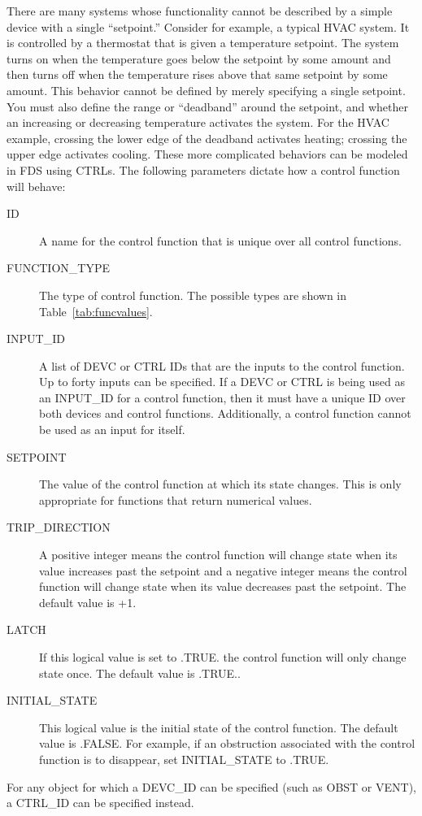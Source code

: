 \documentclass[11pt]{book}
\begin{document}
There are many systems whose functionality cannot be described by a simple device with a single ``setpoint.'' Consider for example, a typical HVAC system.  It is controlled by a thermostat that is given a temperature setpoint. The system turns on when the temperature goes below the setpoint by some amount and then turns off when the temperature rises above that same setpoint by some amount. This behavior cannot be defined by merely specifying a single setpoint. You must also define the range or ``deadband'' around the setpoint, and whether an increasing or decreasing temperature activates the system.  For the HVAC example, crossing the lower edge of the deadband activates heating; crossing the upper edge activates cooling.  These more complicated behaviors can be modeled in FDS using {\ct CTRL}s.  The following parameters dictate how a control function will behave:
\begin{description}
\item[{\ct ID}] A name for the control function that is unique over all control functions.
\item[{\ct FUNCTION\_TYPE}] The type of control function.  The possible types are shown in Table~\ref{tab:funcvalues}.
\item[{\ct INPUT\_ID}] A list of {\ct DEVC} or {\ct CTRL} {\ct ID}s that are the inputs to the control function.  Up to forty inputs can be specified.  If a {\ct DEVC} or {\ct CTRL} is being used as an {\ct INPUT\_ID} for a control function, then it must have a unique {\ct ID} over both devices and control functions.  Additionally, a control function cannot be used as an input for itself.
\item[{\ct SETPOINT}] The value of the control function at which its state changes. This is only appropriate for functions that return numerical values.
\item[{\ct TRIP\_DIRECTION}] A positive integer means the control function will change state when its value increases
past the setpoint and a negative integer means the control function will change state
when its value decreases past the setpoint.  The default value is +1.
\item[{\ct LATCH}] If this logical value is set to {\ct .TRUE.} the control function will only change state once.
The default value is {\ct .TRUE.}.
\item[{\ct INITIAL\_STATE}] This logical value is the initial state of the control function. The default value
is {\ct .FALSE.} For example, if an obstruction associated with the control function is to disappear, set {\ct INITIAL\_STATE} to {\ct .TRUE.}
\end{description}
For any object for which a {\ct DEVC\_ID} can be specified (such as {\ct OBST} or {\ct VENT}), a {\ct CTRL\_ID} can be
specified instead.
\end{document}
